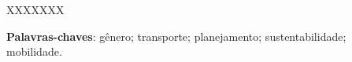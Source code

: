 \documentclass[
  12pt,        %
  openright,      %
  twoside,      %
  a4paper,      %
  english,      %
  brazil        %
]{abntex2}
\begin{document}

\setlength{\absparsep}{18pt} %
\begin{resumo}

XXXXXXX

 \textbf{Palavras-chaves}: gênero; transporte; planejamento; sustentabilidade; mobilidade.
\end{resumo}

%
%

%

%

\listoffigures*
\cleardoublepage

\listofquadros*

\listofgraficos*

\listoftables*
\cleardoublepage
\end{document}
